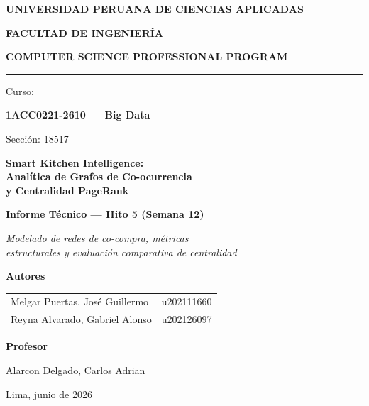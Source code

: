 \documentclass[12pt,a4paper]{article}
\begin{document}
\begin{titlepage}
\centering
\vspace*{0.5cm}
{\LARGE\bfseries UNIVERSIDAD PERUANA DE CIENCIAS APLICADAS\par}
\vspace{0.3cm}
{\Large\bfseries FACULTAD DE INGENIERÍA\par}
\vspace{0.2cm}
{\large\bfseries COMPUTER SCIENCE PROFESSIONAL PROGRAM\par}

\vspace{1.2cm}
{\color{upcred}\rule{6cm}{3pt}}\par
\vspace{0.8cm}

{\large Curso:\par}
{\Large\bfseries 1ACC0221-2610 — Big Data\par}
{\large Sección: 18517\par}

\vspace{1.5cm}
\begin{minipage}{0.85\textwidth}
\centering
{\Large\bfseries Smart Kitchen Intelligence: \\[0.3em]
Analítica de Grafos de Co-ocurrencia\\[0.3em]
y Centralidad PageRank\par}
\end{minipage}

\vspace{1.5cm}
{\large\bfseries Informe Técnico — Hito 5 (Semana 12)\par}
{\large\itshape Modelado de redes de co-compra, métricas\\
estructurales y evaluación comparativa de centralidad\par}

\vspace{1.8cm}
{\large\bfseries Autores\par}
\vspace{0.4cm}
\begin{tabular}{ll}
Melgar Puertas, José Guillermo & u202111660 \\[4pt]
Reyna Alvarado, Gabriel Alonso & u202126097 \\
\end{tabular}

\vspace{1.2cm}
{\large\bfseries Profesor\par}
\vspace{0.3cm}
{\large Alarcon Delgado, Carlos Adrian\par}

\vfill
{\large Lima, junio de 2026\par}
\end{titlepage}
\end{document}
